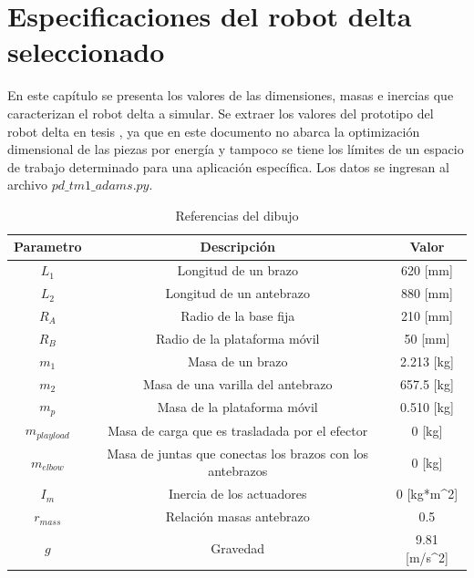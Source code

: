 \chapter{Especificaciones del robot delta seleccionado}\label{CAP5}
En este capítulo se presenta los valores de las dimensiones, masas e inercias que caracterizan el robot delta a simular. Se extraer los valores del prototipo del robot delta en tesis \cite{}, ya que en este documento no abarca la optimización dimensional de las piezas por energía y tampoco se tiene los límites de un espacio de trabajo determinado para una aplicación específica. Los datos se ingresan al archivo $pd\_tm1\_adams.py$.


    \begingroup
        \renewcommand{\arraystretch}{1.5}
        \begin{table}[H]
        \centering
        \begin{tabular}{c c{4cm} c}
           \hline
           \textbf{Parametro}  & \multicolumn{1}{c}{\textbf{Descripción}} & Valor \\\hline\hline
            $L_1$  & Longitud de un brazo           & 620 [mm]                        \\\hline
            $L_2$  & Longitud de un antebrazo       & 880 [mm]                         \\\hline
            $R_A$  & Radio de la base fija           & 210 [mm]                         \\\hline
            $R_B$  & Radio de la plataforma móvil    & 50 [mm]                         \\\hline
            $m_1$  & Masa de un brazo                & 2.213 [kg]                         \\\hline
            $m_2$  & Masa de una varilla del antebrazo  & 657.5 [kg]                         \\\hline
            $m_p$  & Masa de la plataforma móvil     & 0.510 [kg]                         \\\hline
            $m_{playload}$  & Masa de carga que es trasladada por el efector & 0 [kg]           \\\hline
            $m_{elbow}$  & Masa de juntas que conectas los brazos con los antebrazos  & 0 [kg]  \\\hline
            $I_m$  & Inercia de los actuadores           &   0 [kg*m^2]     \\\hline
            $r_{mass}$  & Relación masas antebrazo           & 0.5        \\\hline
            $g$  & Gravedad           & 9.81  [m/s^2]                      \\\hline
        \end{tabular}
        \caption{Referencias del dibujo}
        \label{tab:cap5_tabla_1}
    \end{table}
    \endgroup
    
